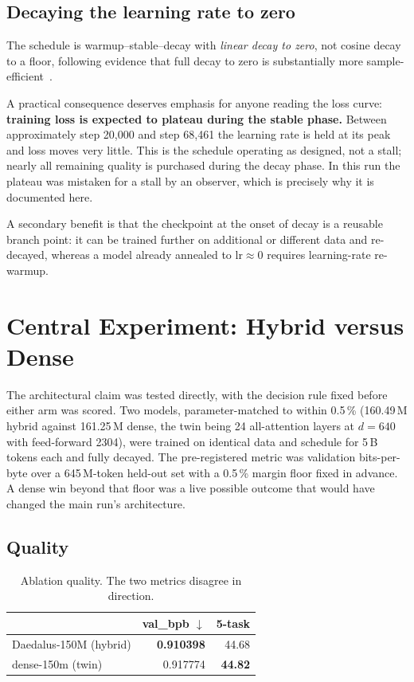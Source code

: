 \documentclass[conference]{IEEEtran}
\begin{document}
\subsection{Decaying the learning rate to zero}

The schedule is warmup--stable--decay with \emph{linear decay to zero}, not
cosine decay to a floor, following evidence that full decay to zero is
substantially more sample-efficient~\cite{d2z}.

A practical consequence deserves emphasis for anyone reading the loss curve:
\textbf{training loss is expected to plateau during the stable phase.} Between
approximately step 20{,}000 and step 68{,}461 the learning rate is held at its
peak and loss moves very little. This is the schedule operating as designed, not
a stall; nearly all remaining quality is purchased during the decay phase. In
this run the plateau was mistaken for a stall by an observer, which is precisely
why it is documented here.

A secondary benefit is that the checkpoint at the onset of decay is a reusable
branch point: it can be trained further on additional or different data and
re-decayed, whereas a model already annealed to $\text{lr} \approx 0$ requires
learning-rate re-warmup.

\section{Central Experiment: Hybrid versus Dense}

The architectural claim was tested directly, with the decision rule fixed before
either arm was scored. Two models, parameter-matched to within 0.5\,\%
(160.49\,M hybrid against 161.25\,M dense, the twin being 24 all-attention
layers at $d=640$ with feed-forward 2304), were trained on identical data and
schedule for 5\,B tokens each and fully decayed. The pre-registered metric was
validation bits-per-byte over a 645\,M-token held-out set with a 0.5\,\% margin
floor fixed in advance. A dense win beyond that floor was a live possible
outcome that would have changed the main run's architecture.

\subsection{Quality}

\begin{table}[t]
\caption{Ablation quality. The two metrics disagree in direction.}
\label{tab:quality}
\centering
\begin{tabular}{@{}lrr@{}}
\toprule
& \textbf{val\_bpb} $\downarrow$ & \textbf{5-task} \\
\midrule
Daedalus-150M (hybrid) & \textbf{0.910398} & 44.68 \\
dense-150m (twin)      & 0.917774 & \textbf{44.82} \\
\bottomrule
\end{tabular}
\end{table}
\end{document}
